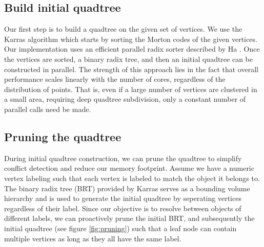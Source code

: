 \documentclass[final,3p,times,twocolumn]{elsarticle}
\begin{document}
\subsection{Build initial quadtree}
\label{sec:build-initial-quadtree}
Our first step is to build a quadtree on the given set of vertices. We use the Karras algorithm \cite{karras2012maximizing} which starts by sorting the Morton codes of the given vertices. Our implementation uses an efficient parallel radix sorter described by Ha \etal {}. Once the vertices are sorted, a binary radix tree, and then an initial quadtree can be constructed in parallel. The strength of this approach lies in the fact that overall performance scales linearly with the number of cores, regardless of the distribution of points. That is, even if a large number of vertices are clustered in a small area, requiring deep quadtree subdivision, only a constant number of parallel calls need be made.


\subsection{Pruning the quadtree}
\label{sec:pruning}
During initial quadtree construction, we can prune the quadtree to simplify conflict detection and reduce our memory footprint. Assume we have a numeric vertex labeling such that each vertex is labeled to match the object it belongs to. The binary radix tree (BRT) provided by Karras serves as a bounding volume hierarchy and is used to generate the initial quadtree by seperating vertices regardless of their label. Since our objective is to resolve between objects of different labels, we can proactively prune the initial BRT, and subsequently the initial quadtree (see figure \ref{fig:pruning}) such that a leaf node can contain multiple vertices as long as they all have the same label.
\end{document}

